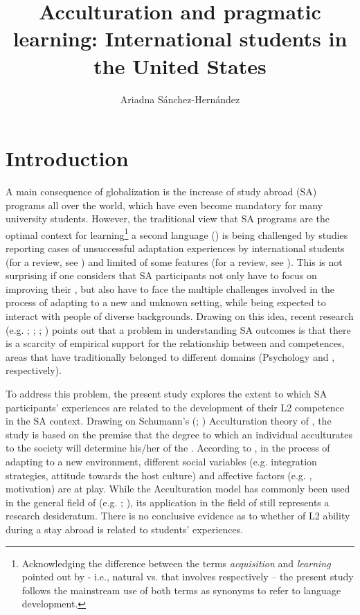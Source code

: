 \documentclass[output=paper]{langsci/langscibook}
\author{Ariadna Sánchez-Hernández\affiliation{Jaume I University}}
\title{Acculturation and pragmatic learning: International students in the United States}
\begin{document}
\section{Introduction}
A main consequence of globalization is the increase of study abroad (SA) programs all over the world, which have even become mandatory for many university students. However, the traditional view that SA programs are the optimal context for learning\footnote{Acknowledging the difference between the terms \textit{acquisition} and \textit{learning} pointed out by \citet{Krashen1985} - i.e., natural  vs.  that involves  respectively – the present study follows the mainstream use of both terms as synonyms to refer to language development.}  a second language () is being challenged by studies reporting cases of unsuccessful adaptation experiences by international students (for a review, see \citealt{MitchellEtAl2015,MitchellEtAl2017}) and limited  of some  features (for a review, see \citealt{TaguchiRoever2017}). This is not surprising if one considers that SA participants not only have to focus on improving their  , but also have to face the multiple challenges involved in the process of adapting to a new and unknown setting, while being expected to interact with people of diverse  backgrounds. Drawing on this idea, recent research (e.g. \citealt{TaguchiEtAl2016}; \citealt{Sykes2017}; \citealt{Taguchi2017}; \citealt{TaguchiRoever2017}) points out that a problem in understanding SA outcomes is that there is a scarcity of empirical support for the relationship between  and  competences, areas that have traditionally belonged to different domains (Psychology and , respectively). 

 
To address this problem, the present study explores the extent to which SA participants’  experiences are related to the development of their L2  competence in the SA context. Drawing on Schumann’s (\citeyear {Schumann1978}; \citeyear{Schumann1986}) Acculturation theory of  , the study is based on the premise that the degree to which an individual acculturates to the  society will determine his/her  of the . According to \citet{Schumann1978}, in the process of adapting to a new environment, different social variables (e.g. integration strategies, attitude towards the host culture) and affective factors (e.g. , motivation) are at play. While the Acculturation model has commonly been used in the general field of   (e.g. \citealt{Hansen1995}; \citealt{Lybeck2002}), its application in the field of   still represents a research desideratum. There is no conclusive evidence as to whether  of L2  ability during a stay abroad is related to students’  experiences.
 
\end{document}
